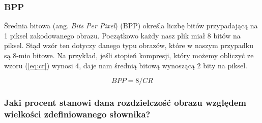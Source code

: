 \documentclass{article}
\begin{document}
\subsubsection{BPP}

Średnia bitowa (ang. \emph{Bits Per Pixel}) (BPP) określa liczbę bitów przypadającą na 1 piksel zakodowanego obrazu. Początkowo każdy nasz plik miał 8 bitów na piksel. Stąd wzór ten dotyczy danego typu obrazów, które w naszym przypadku są 8-mio bitowe. Na przykład, jeśli stopień kompresji, który możemy obliczyć ze wzoru (\ref{eq:cr}) wynosi 4, daje nam średnią bitową wynoszącą 2 bity na piksel.

\begin{equation}
  BPP = 8 / CR
\end{equation}


\subsubsection{Jaki procent stanowi dana rozdzielczość
  obrazu względem wielkości zdefiniowanego słownika?}
\end{document}
